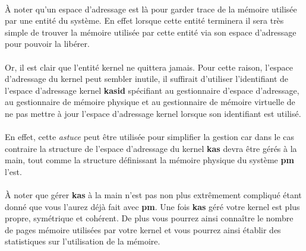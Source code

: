\documentclass[10pt,a4wide]{article}
\begin{document}
\paragraph{}

\`A noter qu'un espace d'adressage est l\`a pour garder trace de la
m\'emoire utilis\'ee par une entit\'e du syst\`eme. En effet lorsque
cette entit\'e terminera il sera tr\`es simple de trouver la m\'emoire
utilis\'ee par cette entit\'e via son espace d'adressage pour pouvoir
la lib\'erer.

\paragraph{}

Or, il est clair que l'entit\'e kernel ne quittera jamais. Pour cette raison,
l'espace d'adressage du kernel peut sembler inutile, il suffirait d'utiliser
l'identifiant de l'espace d'adressage kernel \textbf{kasid} sp\'ecifiant
au gestionnaire d'espace d'adressage, au gestionnaire de m\'emoire physique
et au gestionnaire de m\'emoire virtuelle de ne pas mettre \`a jour l'espace
d'adressage kernel lorsque son identifiant est utilis\'e.

\paragraph{}

En effet, cette \textit{astuce} peut \^etre utilis\'ee pour simplifier
la gestion car dans le cas contraire la structure de l'espace d'adressage
du kernel \textbf{kas} devra \^etre g\'er\'es \`a la main, tout comme
la structure d\'efinissant la m\'emoire physique du syst\`eme
\textbf{pm} l'est.

\paragraph{}

\`A noter que g\'erer \textbf{kas} \`a la main n'est pas non plus extr\^emement
compliqu\'e \'etant donn\'e que vous l'aurez d\'ej\`a fait avec \textbf{pm}.
Une fois \textbf{kas} g\'er\'e votre kernel est plus propre, sym\'etrique
et coh\'erent. De plus vous pourrez ainsi conna\^itre le nombre de pages
m\'emoire utilis\'ees par votre kernel et vous pourrez ainsi \'etablir
des statistiques sur l'utilisation de la m\'emoire.

\paragraph{}
\end{document}
